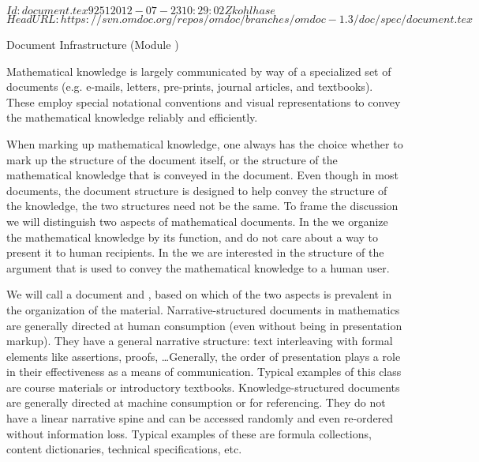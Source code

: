 \svnInfo $Id: document.tex 9251 2012-07-23 10:29:02Z kohlhase $
\svnKeyword $HeadURL: https://svn.omdoc.org/repos/omdoc/branches/omdoc-1.3/doc/spec/document.tex $

\begin{tchapter}[id=omdoc-infrastructure,short=Document Infrastructure]{Document Infrastructure (Module {})}

Mathematical knowledge is largely communicated by way of a specialized set of
documents (e.g. e-mails, letters, pre-prints, journal articles, and textbooks).
These employ special notational conventions and visual
representations to convey the mathematical knowledge reliably and efficiently.

When marking up mathematical knowledge, one always has the choice whether to mark up the
structure of the document itself, or the structure of the mathematical knowledge that is
conveyed in the document. Even though in most documents, the document structure is
designed to help convey the structure of the knowledge, the two structures need not be the
same.  To frame the discussion we will distinguish two aspects of mathematical
documents. In the {} we organize the mathematical
knowledge by its function, and do not care about a way to present it to human
recipients. In the {} we are interested in the
structure of the argument that is used to convey the mathematical knowledge to a human
user.

We will call a document {} and
{}, based on which of the
two aspects is prevalent in the organization of the material.  Narrative-structured
documents in mathematics are generally directed at human consumption (even without being
in presentation markup). They have a general narrative structure: text interleaving with
formal elements like assertions, proofs, \ldots Generally, the order of presentation plays
a role in their effectiveness as a means of communication.  Typical examples of this class
are course materials or introductory textbooks.  Knowledge-structured documents are
generally directed at machine consumption or for referencing. They do not have a linear
narrative spine and can be accessed randomly and even re-ordered without information loss.
Typical examples of these are formula collections, {\openmath} content dictionaries,
technical specifications, etc.


\end{tchapter}
